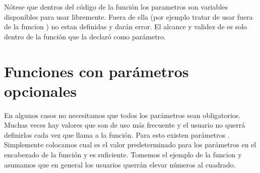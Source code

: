 \documentclass[a4paper,12pt,spanish]{sphinxmanual}
\begin{document}
\begin{sphinxVerbatim}[commandchars=\\\{\}]

    
     
       

\end{sphinxVerbatim}

\sphinxAtStartPar
Nótese que dentros del código de la función los parametros son variables disponibles
para usar libremente. Fuera de ella (por ejemplo tratar de usar  fuera de la
funcion ) no estan definidas y darán error. El alcance y validez de 
es solo dentro de la función que la declaró como parámetro.


\section{Funciones con parámetros opcionales}
\label{\detokenize{fn:funciones-con-parametros-opcionales}}
\sphinxAtStartPar
En algunos casos no necesitamos que todos los parámetros sean obligatorios.
Muchas veces hay valores que son de uso más frecuente y el usuario no querrá
definirlos cada vez que llama a la función.
Para esto existen parámetros . Simplemente colocamos cual es el
valor predeterminado para los parámetros en el encabezado de la función y
es suficiente.
Tomemos el ejemplo de la funcion  y asumamos que en general los
usuarios querrán elevar números al cuadrado.
\end{document}
